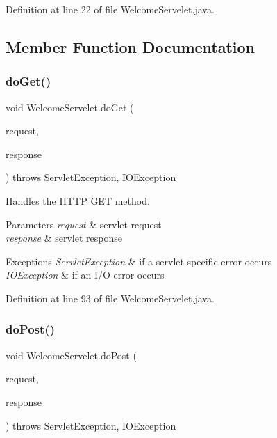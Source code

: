 Definition at line 22 of file Welcome\+Servelet.\+java.



\subsection{Member Function Documentation}
\mbox{\label{class_welcome_servelet_a31f53b6606c34f76392d0a8ad6cec74f}} 
\subsubsection{\texorpdfstring{doGet()}{doGet()}}
{\footnotesize\ttfamily void Welcome\+Servelet.\+do\+Get (\begin{DoxyParamCaption}\item[{Http\+Servlet\+Request}]{request,  }\item[{Http\+Servlet\+Response}]{response }\end{DoxyParamCaption}) throws Servlet\+Exception, I\+O\+Exception\hspace{0.3cm}{\ttfamily [protected]}}

Handles the H\+T\+TP {\ttfamily G\+ET} method.


\begin{DoxyParams}{Parameters}
{\em request} & servlet request \\
\hline
{\em response} & servlet response \\
\hline
\end{DoxyParams}

\begin{DoxyExceptions}{Exceptions}
{\em Servlet\+Exception} & if a servlet-\/specific error occurs \\
\hline
{\em I\+O\+Exception} & if an I/O error occurs \\
\hline
\end{DoxyExceptions}


Definition at line 93 of file Welcome\+Servelet.\+java.

\mbox{\label{class_welcome_servelet_a24e729e76b82516b7c9de7d1173bcad3}} 
\subsubsection{\texorpdfstring{doPost()}{doPost()}}
{\footnotesize\ttfamily void Welcome\+Servelet.\+do\+Post (\begin{DoxyParamCaption}\item[{Http\+Servlet\+Request}]{request,  }\item[{Http\+Servlet\+Response}]{response }\end{DoxyParamCaption}) throws Servlet\+Exception, I\+O\+Exception\hspace{0.3cm}{\ttfamily [protected]}}

